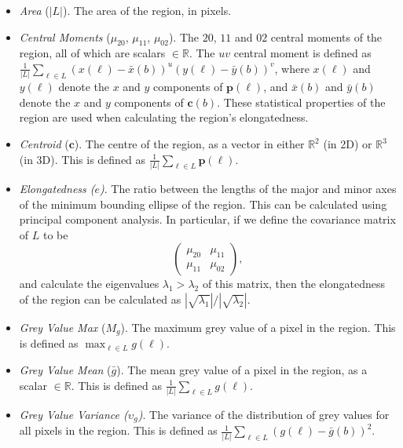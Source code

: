 \begin{itemize}

\item \emph{Area} ($|L|$). The area of the region, in pixels.

\item \emph{Central Moments} ($\mu_{20}$, $\mu_{11}$, $\mu_{02}$). The $20$, $11$ and $02$ central moments of the region, all of which are scalars $\in \mathbb{R}$. The $uv$ central moment is defined as $\displaystyle \frac{1}{|L|} \sum_{\ell \in L} (x(\ell) - \bar{x}(b))^u (y(\ell) - \bar{y}(b))^v$, where $x(\ell)$ and $y(\ell)$ denote the $x$ and $y$ components of $\mathbf{p}(\ell)$, and $\bar{x}(b)$ and $\bar{y}(b)$ denote the $x$ and $y$ components of $\mathbf{c}(b)$. These statistical properties of the region are used when calculating the region's elongatedness.

\item \emph{Centroid} ($\mathbf{c}$). The centre of the region, as a vector in either $\mathbb{R}^2$ (in 2D) or $\mathbb{R}^3$ (in 3D). This is defined as $\displaystyle \frac{1}{|L|} \sum_{\ell \in L} \mathbf{p}(\ell)$.

\item \emph{Elongatedness ($e$)}. The ratio between the lengths of the major and minor axes of the minimum bounding ellipse of the region. This can be calculated using principal component analysis. In particular, if we define the covariance matrix of $L$ to be
%
\[
\left(
\begin{array}{cc}
\mu_{20} & \mu_{11} \\
\mu_{11} & \mu_{02}
\end{array}
\right),
\]
%
and calculate the eigenvalues $\lambda_1 > \lambda_2$ of this matrix, then the elongatedness of the region can be calculated as $|\sqrt{\lambda_1}| / |\sqrt{\lambda_2}|$.

\item \emph{Grey Value Max} ($M_g$). The maximum grey value of a pixel in the region. This is defined as $\displaystyle \max_{\ell \in L} g(\ell)$.

\item \emph{Grey Value Mean} ($\bar{g}$). The mean grey value of a pixel in the region, as a scalar $\in \mathbb{R}$. This is defined as $\displaystyle \frac{1}{|L|} \sum_{\ell \in L} g(\ell)$.

\item \emph{Grey Value Variance ($\upsilon_g$)}. The variance of the distribution of grey values for all pixels in the region. This is defined as $\displaystyle \frac{1}{|L|} \sum_{\ell \in L} (g(\ell) - \bar{g}(b))^2$.


\end{itemize}
